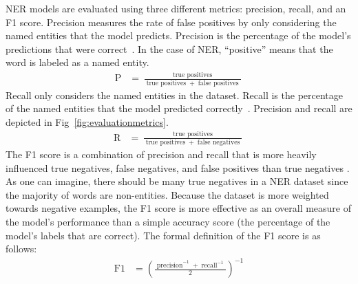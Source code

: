 NER models are evaluated using three different metrics: precision, recall, and an F1 score. Precision measures the rate of false positives by only considering the named entities that the model predicts. Precision is the percentage of the model's predictions that were correct~\citep{conll}. In the case of NER, ``positive'' means that the word is labeled as a named entity.
{
    {
        \begin{align*} 
            \operatorname{P} &= \frac{\operatorname{true\ positives}}{\operatorname{true\ positives} + \operatorname{false\ positives}}
        \end{align*} 
    }
}
Recall only considers the named entities in the dataset. Recall is the percentage of the named entities that the model predicted correctly~\citep{conll}. Precision and recall are depicted in Fig~\ref{fig:evaluationmetrics}.
{
    {
        \begin{align*} 
            \operatorname{R} &= \frac{\operatorname{true\ positives}}{\operatorname{true\ positives} + \operatorname{false\ negatives}}
        \end{align*} 
    }
}
 The F1 score is a combination of precision and recall that is more heavily influenced true negatives, false negatives, and false positives than true negatives \citep{NERevaluationmetrics}. As one can imagine, there should be many true negatives in a NER dataset since the majority of words are non-entities. Because the dataset is more weighted towards negative examples, the F1 score is more effective as an overall measure of the model's performance than a simple accuracy score (the percentage of the model's labels that are correct). The formal definition of the F1 score is as follows:
{
    {
        \begin{align*} 
            \operatorname{F1} &= {(\frac{\operatorname{precision}^{-1} + \operatorname{recall}^{-1}}{2})}^{-1}
        \end{align*} 
    }
}



